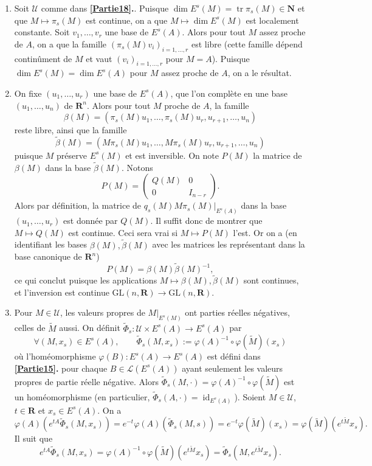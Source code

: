 \documentclass[french, 12pt]{article}
\theoremstyle{definition}
\newcommand{\wt}[1]{\widetilde{#1}}
\newcommand{\Nbb}{\mathbf{N}}
\newcommand{\Rbb}{\mathbf{R}}
\newcommand{\Lcal}{\mathcal{L}}
\newcommand{\Ucal}{\mathcal{U}}
\newcommand{\tr}{\operatorname{tr}}
\newcommand{\id}{\operatorname{id}}
\begin{document}
\begin{enumerate}
    \item \label{Partie19} Soit $\Ucal$ comme dans {\bf \ref{Partie18}.}. Puisque $\dim E^s(M) = \tr \pi_s(M) \in \Nbb$ et que $M \mapsto \pi_s(M)$ est continue, on a que $M \mapsto \dim E^s(M)$ est localement constante. Soit $v_1, \dots, v_r$ une base de $E^s(A)$. Alors pour tout $M$ assez proche de $A$, on a que la famille $(\pi_s(M) v_i)_{i=1, \dots, r}$ est libre (cette famille d\'epend contin\^ument de $M$ et vaut $(v_i)_{i=1, \dots,r}$ pour $M = A$). Puisque $\dim E^s(M) = \dim E^s(A)$ pour $M$ assez proche de $A$, on a le r\'esultat.
    
    \item \label{Partie20} On fixe $(u_1, \dots, u_r)$ une base de $E^s(A)$, que l'on compl\`ete en une base $(u_1, \dots, u_n)$ de $\Rbb^n$. Alors pour tout $M$ proche de $A$, la famille 
    $$\beta(M) = \left(\pi_s(M)u_1, \dots, \pi_s(M)u_r, u_{r+1}, \dots, u_n\right)$$ reste libre, ainsi que la famille
    $$\tilde\beta(M) = \left(M\pi_s(M) u _1, \dots, M\pi_s(M) u_r, u_{r+1}, \dots, u_n\right)$$ puisque $M$ pr\'eserve $E^s(M)$ et est inversible. On note $P(M)$ la matrice de $\beta(M)$ dans la base $\tilde \beta(M)$. Notons
    $$
    P(M) = \begin{pmatrix} Q(M) & 0 \\ 0 & I_{n-r} \end{pmatrix}.
    $$
  Alors par d\'efinition, la matrice de $q_s(M) M \pi_s(M)|_{E^s(A)}$ dans la base $(u_1, \dots, u_r)$ est donn\'ee par $Q(M)$. Il suffit donc de montrer que $M \mapsto Q(M)$ est continue. Ceci sera vrai si $M \mapsto P(M)$ l'est. Or on a (en identifiant les bases $\beta(M), \tilde \beta(M)$ avec les matrices les repr\'esentant dans la base canonique de $\Rbb^n$)
  $$
  P(M) = \beta(M) \tilde \beta(M)^{-1},
  $$
  ce qui conclut puisque les applications $M \mapsto \beta(M), \tilde \beta(M)$ sont continues, et l'inversion est continue $\mathrm{GL}(n,\Rbb) \to \mathrm{GL}(n, \Rbb)$.
    \item \label{Partie21} Pour $M \in \Ucal$, les valeurs propres de $M|_{E^s(M)}$ ont parties r\'eelles n\'egatives, celles de $\wt{M}$ aussi. On d\'efinit $\wt{\Phi}_s: \Ucal \times E^{s}(A) \to E^s(A)$ par
        $$\forall (M, x_s) \in E^s(A), \qquad \wt{\Phi}_s(M,x_s) := \varphi(A)^{-1} \circ \varphi(\wt{M})(x_s)$$
    o\`u l'hom\'eomorphisme $\varphi(B): E^s(A) \to E^s(A)$ est d\'efini dans {\bf \ref{Partie15}.} pour chaque $B \in \Lcal(E^s(A))$ ayant seulement les valeurs propres de partie r\'eelle n\'egative. Alors $\wt{\Phi}_s(M,\cdot) = \varphi(A)^{-1} \circ \varphi(\wt{M})$ est un hom\'eomorphisme (en particulier, $\wt{\Phi}_s(A,\cdot) = \id_{E^s(A)}$). Soient $M \in \Ucal$, $t \in \Rbb$ et $x_s \in E^s(A)$. On a
        $$\varphi(A)(e^{tA} \wt{\Phi}_s(M,x_s)) = e^{-t}\varphi(A) (\wt{\Phi}_s(M,s)) = e^{-t}\varphi(\wt{M})(x_s) = \varphi(\wt{M})(e^{t\wt{M}}x_s).$$
    Il suit que
        $$e^{tA} \wt{\Phi}_s(M,x_s) = \varphi(A)^{-1} \circ \varphi(\wt{M})(e^{t\wt{M}}x_s) = \wt{\Phi}_s(M, e^{t\wt{M}}x_s).$$
    

\end{enumerate}
\end{document}
